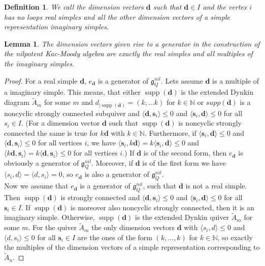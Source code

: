 \documentclass{article}
\newcommand{\bs}{\mathbf{s}}
\newcommand{\bd}{\mathbf{d}}
\DeclareMathOperator{\supp}{supp}
\newtheorem{lemma}[theorem]{Lemma}
\newtheorem{definition}[theorem]{Definition}
\begin{document}
\begin{definition}
    We call the dimension vectors $\bd$ such that $\bd \in I$ and the vertex $i$ has no loops real simples and all the other dimension vectors of a simple representation imaginary simples. 
\end{definition}

\begin{lemma}
    The dimension vectors given rise to a generator in the construction of the nilpotent Kac-Moody algebra are exactly the real simples and all multiples of the imaginary simples.  
\end{lemma}
\begin{proof}
For a real simple $\bd$, $e_{\bd}$ is a generator of $\mathfrak{g}_Q^{nil}$. Lets assume $\bd$ is a multiple of a imaginary simple. This means, that either $\supp(\bd)$ is the extended Dynkin diagram $\tilde{A}_m$ for some $m$ and $d_{|\supp(\bd)} =(k, \dots k)$ for $k \in \mathbb{N}$ or $supp(\bd)$ is a noncyclic strongly connected subquiver and $\langle \bd, \bs_i \rangle \leq 0$ and $\langle \bs_i, \bd \rangle \leq 0$ for all $s_i \in I$. (For a dimension vector $\bd$ such that $\supp(\bd)$ is noncyclic strongly connected the same is true for $k\bd$ with $k \in \mathbb{N}$. Furthermore, if $\langle \bs_i, \bd \rangle \leq 0$ and $\langle \bd, \bs_i \rangle \leq 0$ for all vertices $i$, we have $\langle \bs_i, k\bd \rangle = k \langle \bs_i, \bd \rangle \leq 0$ and $\langle k\bd, \bs_i \rangle = k \langle \bd, \bs_i \rangle\leq 0$ for all vertices $i$.) If $\bd$ is of the second form, then $e_{\bd}$ is obviously a generator of $\mathfrak{g}_Q^{nil}$. Moreover, if $\bd$ is of the first form we have $\langle s_i, d\rangle = \langle d, s_i \rangle =0$, so $e_{\bd}$ is also a generator of $\mathfrak{g}_Q^{nil}$. \\
Now we assume that $e_{\bd}$ is a generator of $\mathfrak{g}_Q^{nil}$, such that $\bd$ is not a real simple. Then $\supp(\bd)$ is strongly connected and $\langle \bd, \bs_i \rangle \leq 0$ and $\langle \bs_i, \bd \rangle \leq 0$ for all $\bs_i \in I$. If $\supp(\bd)$ is moreover also noncyclic strongly connected, then it is an imaginary simple. Otherwise, $\supp(\bd)$ is the extended Dynkin quiver $\tilde{A}_m$ for some $m$. For the quiver $\tilde{A}_m$ the only dimension vectors $\bd$ with $\langle s_i, d\rangle \leq 0$ and $\langle d, s_i \rangle  \leq 0$ for all $\bs_i \in I$ are the ones of the form $(k, \dots, k)$ for $k \in \mathbb{N}$, so exactly the multiples of the dimension vectors of a simple representation corresponding to $\tilde{A}_n$.
\end{proof}
\end{document}
